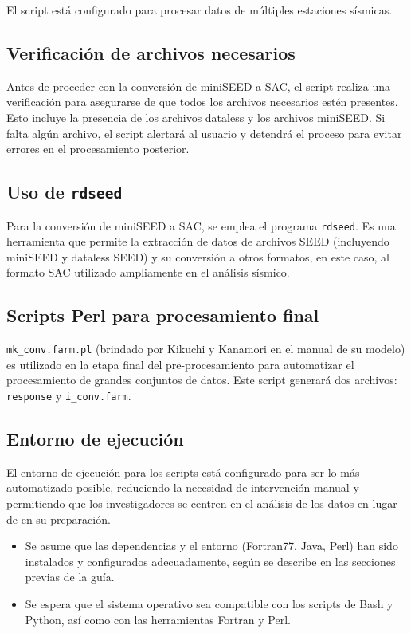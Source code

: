 \documentclass[a4paper,11pt]{refart}
\begin{document}
El script está configurado para procesar datos de múltiples estaciones sísmicas.

\subsection{Verificación de archivos necesarios}

Antes de proceder con la conversión de miniSEED a SAC, el script realiza una verificación para asegurarse de que todos los archivos necesarios estén presentes. Esto incluye la presencia de los archivos dataless y los archivos miniSEED. Si falta algún archivo, el script alertará al usuario y detendrá el proceso para evitar errores en el procesamiento posterior.

\subsection{Uso de \texttt{rdseed}}

Para la conversión de miniSEED a SAC, se emplea el programa \texttt{rdseed}. Es una herramienta que permite la extracción de datos de archivos SEED (incluyendo miniSEED y dataless SEED) y su conversión a otros formatos, en este caso, al formato SAC utilizado ampliamente en el análisis sísmico.

\subsection{Scripts Perl para procesamiento final}

\texttt{mk\_conv.farm.pl} (brindado por Kikuchi y Kanamori en el manual de su modelo) es utilizado en la etapa final del pre-procesamiento para automatizar el procesamiento de grandes conjuntos de datos. Este script generará dos archivos: \texttt{response} y \texttt{i\_conv.farm}.

\subsection{Entorno de ejecución}

El entorno de ejecución para los scripts está configurado para ser lo más automatizado posible, reduciendo la necesidad de intervención manual y permitiendo que los investigadores se centren en el análisis de los datos en lugar de en su preparación.

\begin{itemize}
\item Se asume que las dependencias y el entorno (Fortran77, Java, Perl) han sido instalados y configurados adecuadamente, según se describe en las secciones previas de la guía.
\item Se espera que el sistema operativo sea compatible con los scripts de Bash y Python, así como con las herramientas Fortran y Perl.
\end{itemize}
\end{document}
